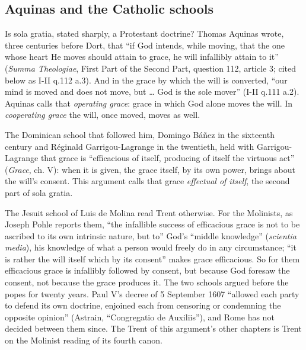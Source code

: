 \documentclass[11pt]{article}
\begin{document}
\subsection*{Aquinas and the Catholic schools}
Is sola gratia, stated sharply, a Protestant doctrine? Thomas Aquinas wrote, three centuries before Dort, that “if God intends, while moving, that the one whose heart He moves should attain to grace, he will infallibly attain to it” (\emph{Summa Theologiae}, First Part of the Second Part, question 112, article 3; cited below as I-II q.112 a.3). And in the grace by which the will is converted, “our mind is moved and does not move, but … God is the sole mover” (I-II q.111 a.2). Aquinas calls that \emph{operating grace}: grace in which God alone moves the will. In \emph{cooperating grace} the will, once moved, moves as well.

The Dominican school that followed him, Domingo Báñez in the sixteenth century and Réginald Garrigou-Lagrange in the twentieth, held with Garrigou-Lagrange that grace is “efficacious of itself, producing of itself the virtuous act” (\emph{Grace}, ch. V): when it is given, the grace itself, by its own power, brings about the will’s consent. This argument calls that grace \emph{effectual of itself}, the second part of sola gratia.

The Jesuit school of Luis de Molina read Trent otherwise. For the Molinists, as Joseph Pohle reports them, “the infallible success of efficacious grace is not to be ascribed to its own intrinsic nature, but to” God’s “middle knowledge” (\emph{scientia media}), his knowledge of what a person would freely do in any circumstance; “it is rather the will itself which by its consent” makes grace efficacious. So for them efficacious grace is infallibly followed by consent, but because God foresaw the consent, not because the grace produces it. The two schools argued before the popes for twenty years. Paul V’s decree of 5 September 1607 “allowed each party to defend its own doctrine, enjoined each from censoring or condemning the opposite opinion” (Astrain, “Congregatio de Auxiliis”), and Rome has not decided between them since. The Trent of this argument’s other chapters is Trent on the Molinist reading of its fourth canon.
\end{document}
